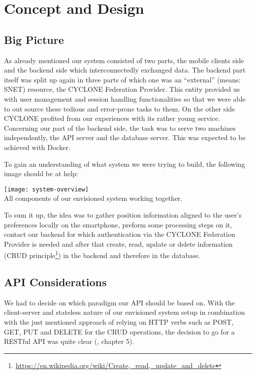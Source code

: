 \chapter{Concept and Design}
\label{cha:conceptanddesign}


\section{Big Picture}

As already mentioned our system consisted of two parts, the mobile clients side and the backend side which interconnectedly exchanged data. The backend part itself was split up again in three parts of which one was an \enquote{external} (means: SNET) resource, the CYCLONE Federation Provider. This entity provided us with user management and session handling functionalities so that we were able to out source these tedious and error-prone tasks to them. On the other side CYCLONE profited from our experiences with its rather young service. Concerning our part of the backend side, the task was to serve two machines independently, the API server and the database server. This was expected to be achieved with Docker.

To gain an understanding of what system we were trying to build, the following image should be at help:

\begin{center}
    \texttt{[image: system-overview]}\\
    All components of our envisioned system working together.
\end{center}

To sum it up, the idea was to gather position information aligned to the user's preferences locally on the smartphone, preform some processing steps on it, contact our backend for which authentication via the CYCLONE Federation Provider is needed and after that create, read, update or delete information (CRUD principle\footnote{\url{https://en.wikipedia.org/wiki/Create,_read,_update_and_delete}}) in the backend and therefore in the database.


\vspace{0.5cm}

\section{API Considerations}

We had to decide on which paradigm our API should be based on. With the client-server and stateless nature of our envisioned system setup in combination with the just mentioned approach of relying on HTTP verbs such as POST, GET, PUT and DELETE for the CRUD operations, the decision to go for a RESTful API was quite clear (\cite{fielding2000architectural}, chapter 5).

